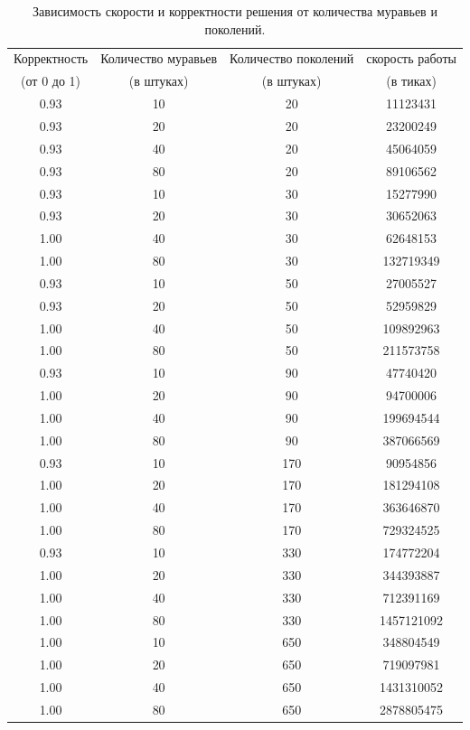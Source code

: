 \documentclass[a4paper, 14pt]{article}
\begin{document}
    \begin{table}[h]
        \caption{Зависимость скорости и корректности решения от количества муравьев и поколений.}
            \begin{tabular}{ | c | c | c | c | }
                \hline
                 Корректность   &  Количество муравьев   &  Количество поколений  &  скорость работы \\
                 (от 0 до 1) & (в штуках) & (в штуках) & (в тиках) \\ \hline  
                0.93 &  10 &  20 &   11123431 \\
                0.93 & 20 &  20 &   23200249 \\
                0.93 & 40 &  20 &   45064059 \\
                0.93 & 80 &  20 &   89106562 \\
                0.93 & 10 &  30 &   15277990 \\
                0.93 & 20 &  30 &   30652063 \\
                1.00 & 40 &  30 &   62648153 \\
                1.00 & 80 &  30 &  132719349 \\
                0.93 & 10 &  50 &   27005527 \\
                0.93 & 20 &  50 &   52959829 \\
                1.00 & 40 &  50 &  109892963 \\
                1.00 & 80 &  50 &  211573758 \\
                0.93 & 10 &  90 &   47740420 \\
                1.00 & 20 &  90 &   94700006 \\
                1.00 & 40 &  90 &  199694544 \\
                1.00 & 80 &  90 &  387066569 \\
                0.93 & 10 & 170 &   90954856 \\
                1.00 & 20 & 170 &  181294108 \\
                1.00 & 40 & 170 &  363646870 \\
                1.00 & 80 & 170 &  729324525 \\
                0.93 & 10 & 330 &  174772204 \\
                1.00 & 20 & 330 &  344393887 \\
                1.00 & 40 & 330 &  712391169 \\
                1.00 & 80 & 330 & 1457121092 \\
                1.00 & 10 & 650 &  348804549 \\
                1.00 & 20 & 650 &  719097981 \\
                1.00 & 40 & 650 & 1431310052 \\
                1.00 & 80 & 650 & 2878805475 \\
                \hline
            \end{tabular}
        \label{tab:ants_time}
    \end{table} 
    
\end{document}
